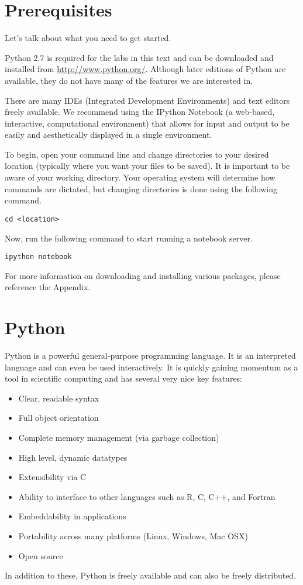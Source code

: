 \label{lab:Essential_Python}

\section*{Prerequisites}
Let's talk about what you need to get started.

Python 2.7 is required for the labs in this text and can be downloaded and 
installed from \url{http://www.python.org/}. Although later editions of 
Python are available, they do not have many of the features we are interested in. 

There are many IDEs (Integrated Development Environments) and text editors freely 
available. We recommend using the IPython Notebook (a web-based, interactive, 
computational environment) that allows for input and output to be easily 
and aesthetically displayed in a single environment. 

To begin, open your command line and change directories to your desired location 
(typically where you want your files to be saved). It is important to be aware 
of your working directory. Your operating system will determine how commands are dictated, 
but changing directories is done using the following command.
\begin{lstlisting}
cd <location>
\end{lstlisting}
Now, run the following command to start running a notebook server.
\begin{lstlisting}
ipython notebook
\end{lstlisting}

For more information on downloading and installing various packages, please 
reference the Appendix. 


\section*{Python}
Python is a powerful general-purpose programming language. It is an interpreted
language and can even be used interactively. 
It is quickly gaining momentum as a tool in scientific computing and has several 
very nice key features:
\begin{itemize}
\item Clear, readable syntax
\item Full object orientation
\item Complete memory management (via garbage collection)
\item High level, dynamic datatypes
\item Extensibility via C
\item Ability to interface to other languages such as R, C, C++, and Fortran
\item Embeddability in applications
\item Portability across many platforms (Linux, Windows, Mac OSX)
\item Open source

\end{itemize}
In addition to these, Python is freely available and can also be freely distributed.

